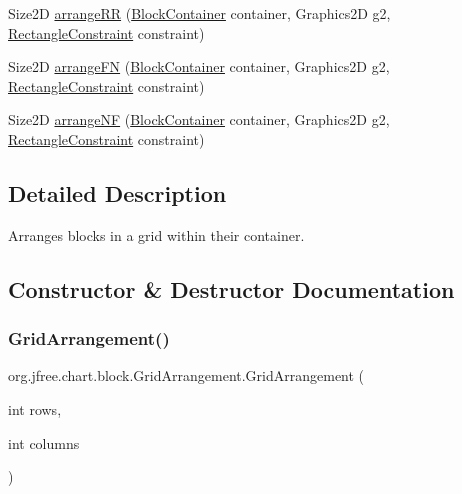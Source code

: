 \begin{DoxyCompactItemize}
\item 
Size2D \mbox{\hyperlink{classorg_1_1jfree_1_1chart_1_1block_1_1_grid_arrangement_a6641861e7e7c41959b800d6285a77395}{arrange\+RR}} (\mbox{\hyperlink{classorg_1_1jfree_1_1chart_1_1block_1_1_block_container}{Block\+Container}} container, Graphics2D g2, \mbox{\hyperlink{classorg_1_1jfree_1_1chart_1_1block_1_1_rectangle_constraint}{Rectangle\+Constraint}} constraint)
\item 
Size2D \mbox{\hyperlink{classorg_1_1jfree_1_1chart_1_1block_1_1_grid_arrangement_afd393dd801f1088e81dd6ccd6d01dbfb}{arrange\+FN}} (\mbox{\hyperlink{classorg_1_1jfree_1_1chart_1_1block_1_1_block_container}{Block\+Container}} container, Graphics2D g2, \mbox{\hyperlink{classorg_1_1jfree_1_1chart_1_1block_1_1_rectangle_constraint}{Rectangle\+Constraint}} constraint)
\item 
Size2D \mbox{\hyperlink{classorg_1_1jfree_1_1chart_1_1block_1_1_grid_arrangement_ad8030133343aba605695cf71c10fc969}{arrange\+NF}} (\mbox{\hyperlink{classorg_1_1jfree_1_1chart_1_1block_1_1_block_container}{Block\+Container}} container, Graphics2D g2, \mbox{\hyperlink{classorg_1_1jfree_1_1chart_1_1block_1_1_rectangle_constraint}{Rectangle\+Constraint}} constraint)
\end{DoxyCompactItemize}


\subsection{Detailed Description}
Arranges blocks in a grid within their container. 

\subsection{Constructor \& Destructor Documentation}
\mbox{\label{classorg_1_1jfree_1_1chart_1_1block_1_1_grid_arrangement_ad9871f51d97c209ac3cc962ea971c2c8}} 
\subsubsection{\texorpdfstring{Grid\+Arrangement()}{GridArrangement()}}
{\footnotesize\ttfamily org.\+jfree.\+chart.\+block.\+Grid\+Arrangement.\+Grid\+Arrangement (\begin{DoxyParamCaption}\item[{int}]{rows,  }\item[{int}]{columns }\end{DoxyParamCaption})}


